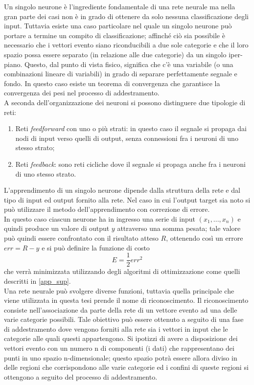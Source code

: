 \newpage
Un singolo neurone è l'ingrediente fondamentale di una rete neurale ma nella gran parte dei casi non è in grado di ottenere da solo nessuna classificazione degli input. Tuttavia esiste una caso particolare nel quale un singolo neurone può portare a termine un compito di classificazione; affinché ciò sia possibile è necessario che i vettori evento siano riconducibili a due sole categorie e che il loro spazio possa essere separato (in relazione alle due categorie) da un singolo iper-piano. Questo, dal punto di vista fisico, significa che c'è una variabile (o una combinazioni lineare di variabili) in grado di separare perfettamente segnale e fondo. In questo caso esiste un teorema di convergenza che garantisce la convergenza dei pesi nel processo di addestramento.\\
A seconda dell'organizzazione dei neuroni si possono distinguere due tipologie di reti:
\begin{enumerate}
	\item Reti \textit{feedforward} con uno o più strati: in questo caso il segnale si propaga dai nodi di input verso quelli di output, senza connessioni fra i neuroni di uno stesso strato;
	\item Reti \textit{feedback}: sono reti cicliche dove il segnale si propaga anche fra i neuroni di uno stesso strato.
\end{enumerate}
L'apprendimento di un singolo neurone dipende dalla struttura della rete e dal tipo di input ed output fornito alla rete. Nel caso in cui l'output target sia noto si può utilizzare il metodo dell'apprendimento con correzione di errore. \\
In questo caso ciascun neurone ha in ingresso una serie di input $(x_1,...,x_n)$ e quindi produce un valore di output $y$ attraverso una somma pesata; tale valore può quindi essere confrontato con il risultato atteso $R$, ottenendo così un errore $err = R - y$ e si può definire la funzione di costo
\begin{equation}
E = \frac{1}{2}err^2
\end{equation}
che verrà minimizzata utilizzando degli algoritmi di ottimizzazione come quelli descritti in \ref{app_sup}.\\
Una rete neurale può svolgere diverse funzioni, tuttavia quella principale che viene utilizzata in questa tesi prende il nome di riconoscimento. Il riconoscimento consiste nell'associazione da parte della rete di un vettore evento ad una delle varie categorie possibili. Tale obiettivo può essere ottenuto a seguito di una fase di addestramento dove vengono forniti alla rete sia i vettori in input che le categorie alle quali questi appartengono. Si ipotizzi di avere a disposizione dei vettori evento con un numero n di componenti (i dati) che rappresentano dei punti in uno spazio n-dimensionale; questo spazio potrà essere allora diviso in delle regioni che corrispondono alle varie categorie ed i confini di queste regioni si ottengono a seguito del processo di addestramento. \\

